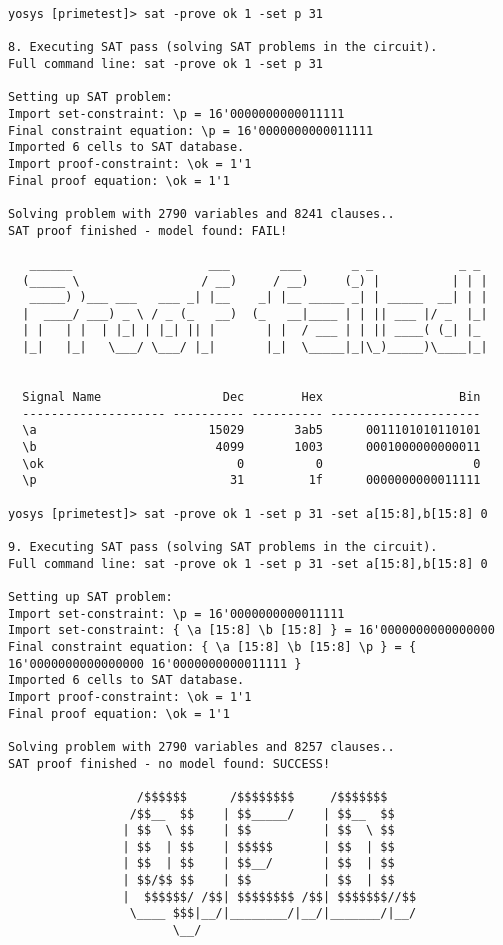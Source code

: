 \documentclass[9pt,technote,a4paper]{IEEEtran}
\begin{document}
\begin{figure*}[!t]
\begin{lstlisting}[basicstyle=\ttfamily\small]
yosys [primetest]> sat -prove ok 1 -set p 31

8. Executing SAT pass (solving SAT problems in the circuit).
Full command line: sat -prove ok 1 -set p 31

Setting up SAT problem:
Import set-constraint: \p = 16'0000000000011111
Final constraint equation: \p = 16'0000000000011111
Imported 6 cells to SAT database.
Import proof-constraint: \ok = 1'1
Final proof equation: \ok = 1'1

Solving problem with 2790 variables and 8241 clauses..
SAT proof finished - model found: FAIL!

   ______                   ___       ___       _ _            _ _ 
  (_____ \                 / __)     / __)     (_) |          | | |
   _____) )___ ___   ___ _| |__    _| |__ _____ _| | _____  __| | |
  |  ____/ ___) _ \ / _ (_   __)  (_   __|____ | | || ___ |/ _  |_|
  | |   | |  | |_| | |_| || |       | |  / ___ | | || ____( (_| |_ 
  |_|   |_|   \___/ \___/ |_|       |_|  \_____|_|\_)_____)\____|_|


  Signal Name                 Dec        Hex                   Bin
  -------------------- ---------- ---------- ---------------------
  \a                        15029       3ab5      0011101010110101
  \b                         4099       1003      0001000000000011
  \ok                           0          0                     0
  \p                           31         1f      0000000000011111

yosys [primetest]> sat -prove ok 1 -set p 31 -set a[15:8],b[15:8] 0

9. Executing SAT pass (solving SAT problems in the circuit).
Full command line: sat -prove ok 1 -set p 31 -set a[15:8],b[15:8] 0

Setting up SAT problem:
Import set-constraint: \p = 16'0000000000011111
Import set-constraint: { \a [15:8] \b [15:8] } = 16'0000000000000000
Final constraint equation: { \a [15:8] \b [15:8] \p } = { 16'0000000000000000 16'0000000000011111 }
Imported 6 cells to SAT database.
Import proof-constraint: \ok = 1'1
Final proof equation: \ok = 1'1

Solving problem with 2790 variables and 8257 clauses..
SAT proof finished - no model found: SUCCESS!

                  /$$$$$$      /$$$$$$$$     /$$$$$$$    
                 /$$__  $$    | $$_____/    | $$__  $$   
                | $$  \ $$    | $$          | $$  \ $$   
                | $$  | $$    | $$$$$       | $$  | $$   
                | $$  | $$    | $$__/       | $$  | $$   
                | $$/$$ $$    | $$          | $$  | $$   
                |  $$$$$$/ /$$| $$$$$$$$ /$$| $$$$$$$//$$
                 \____ $$$|__/|________/|__/|_______/|__/
                       \__/                              
\end{lstlisting}
\caption{Experiments with the miter circuit from Fig.~\ref{primetest}. The first attempt of proving that 31
is prime failed because the SAT solver found a creative way of factorizing 31 using integer overflow.}
\label{primesat}
\end{figure*}
\end{document}
